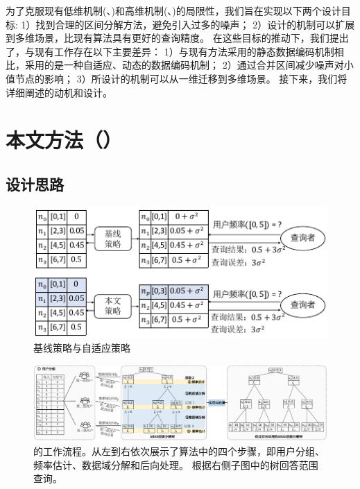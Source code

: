 为了克服现有低维机制(\myhio、\mydht)和高维机制(\mycalm、\myHDG)的局限性，我们旨在实现以下两个设计目标:
1）找到合理的区间分解方法，避免引入过多的噪声；
2）设计的机制可以扩展到多维场景，比现有算法具有更好的查询精度。
在这些目标的推动下，我们提出了\myahead，与现有工作存在以下主要差异：
1）与现有方法采用的静态数据编码机制相比，\myahead 采用的是一种自适应、动态的数据编码机制；
2）\myahead 通过合并区间减少噪声对小值节点的影响；
3）所设计的机制可以从一维迁移到多维场景。
接下来，我们将详细阐述\myahead 的动机和设计。

\section{本文方法（\myahead）}
\label{Adaptive Hierarchical Decomposition}

\subsection{设计思路}
\label{Motivation and Overview}
\begin{figure}[!t]
    \centering
    \includegraphics[width=0.75\hsize]{figure/ldp_range_query/figures_others/Motivation3ch.pdf}
    \caption{基线策略与自适应策略}
    \label{Method Motivation}
\end{figure} 

\begin{figure}[t]
    \centering
    \includegraphics[width=\hsize]{figure/ldp_range_query/figures_others/OverviewAHEAD4ch.pdf}
    \caption{\myahead 的工作流程。从左到右依次展示了\myahead 算法中的四个步骤，即用户分组、频率估计、数据域分解和后向处理。 
    \myahead 根据右侧子图中的树回答范围查询。} 
    \label{AHEAD method}   
\end{figure}


